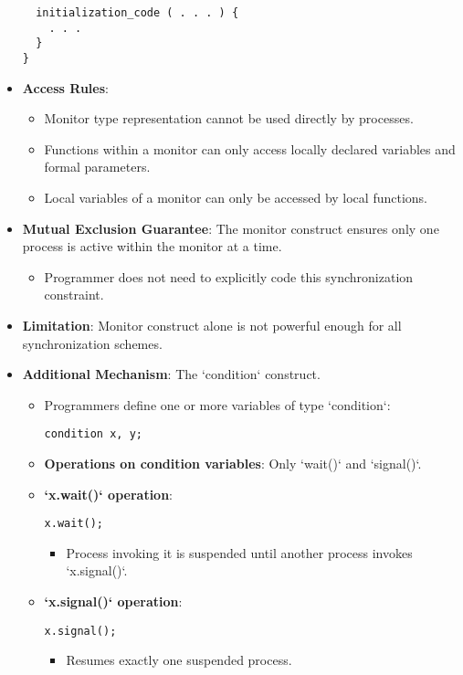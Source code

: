 \begin{itemize}
\begin{verbatim}
  initialization_code ( . . . ) {
    . . .
  }
}
\end{verbatim}
    \item \textbf{Access Rules}:
    \begin{itemize}
        \item Monitor type representation cannot be used directly by processes.
        \item Functions within a monitor can only access locally declared variables and formal parameters.
        \item Local variables of a monitor can only be accessed by local functions.
    \end{itemize}
    \item \textbf{Mutual Exclusion Guarantee}: The monitor construct ensures only one process is active within the monitor at a time.
    \begin{itemize}
        \item Programmer does not need to explicitly code this synchronization constraint.
    \end{itemize}
    \item \textbf{Limitation}: Monitor construct alone is not powerful enough for all synchronization schemes.
    \item \textbf{Additional Mechanism}: The `condition` construct.
    \begin{itemize}
        \item Programmers define one or more variables of type `condition`:
\begin{verbatim}
condition x, y;
\end{verbatim}
        \item \textbf{Operations on condition variables}: Only `wait()` and `signal()`.
        \item \textbf{`x.wait()` operation}:
\begin{verbatim}
x.wait();
\end{verbatim}
        \begin{itemize}
            \item Process invoking it is suspended until another process invokes `x.signal()`.
        \end{itemize}
        \item \textbf{`x.signal()` operation}:
\begin{verbatim}
x.signal();
\end{verbatim}
        \begin{itemize}
            \item Resumes exactly one suspended process.

\end{itemize}
\end{itemize}
\end{itemize}
